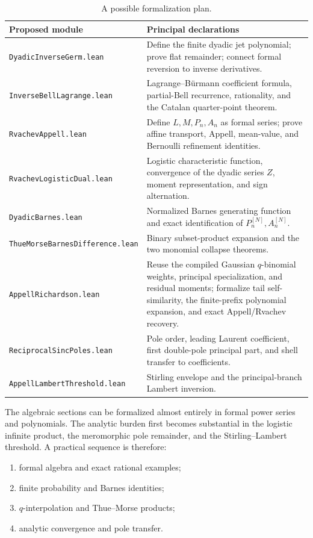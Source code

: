 \documentclass[11pt,oneside]{article}
\theoremstyle{frontier}
\theoremstyle{definition}
\theoremstyle{remark}
\begin{document}
\begin{table}[htbp]
\centering
\small
\begin{tabularx}{\textwidth}{@{}>{\raggedright\arraybackslash}p{}X@{}}
\toprule
Proposed module & Principal declarations \\
\midrule
\texttt{DyadicInverseGerm.lean}
& Define the finite dyadic jet polynomial; prove flat remainder; connect formal reversion to inverse derivatives. \\
\texttt{InverseBellLagrange.lean}
& Lagrange--B\"urmann coefficient formula, partial-Bell recurrence, rationality, and the Catalan quarter-point theorem. \\
\texttt{RvachevAppell.lean}
& Define $L,M,P_n,A_n$ as formal series; prove affine transport, Appell, mean-value, and Bernoulli refinement identities. \\
\texttt{RvachevLogisticDual.lean}
& Logistic characteristic function, convergence of the dyadic series $Z$, moment representation, and sign alternation. \\
\texttt{DyadicBarnes.lean}
& Normalized Barnes generating function and exact identification of $P_n^{[N]},A_n^{[N]}$. \\
\texttt{ThueMorseBarnesDifference.lean}
& Binary subset-product expansion and the two monomial collapse theorems. \\
\texttt{AppellRichardson.lean}
& Reuse the compiled Gaussian $q$-binomial weights, principal specialization, and residual moments; formalize tail self-similarity, the finite-prefix polynomial expansion, and exact Appell/Rvachev recovery. \\
\texttt{ReciprocalSincPoles.lean}
& Pole order, leading Laurent coefficient, first double-pole principal part, and shell transfer to coefficients. \\
\texttt{AppellLambertThreshold.lean}
& Stirling envelope and the principal-branch Lambert inversion. \\
\bottomrule
\end{tabularx}
\caption{A possible formalization plan.}
\label{tab:lean-roadmap}
\end{table}

The algebraic sections can be formalized almost entirely in formal power series and polynomials.
The analytic burden first becomes substantial in the logistic infinite product, the meromorphic pole
remainder, and the Stirling--Lambert threshold.  A practical sequence is therefore:
\begin{enumerate}
\item formal algebra and exact rational examples;
\item finite probability and Barnes identities;
\item $q$-interpolation and Thue--Morse products;
\item analytic convergence and pole transfer.
\end{enumerate}
\end{document}
